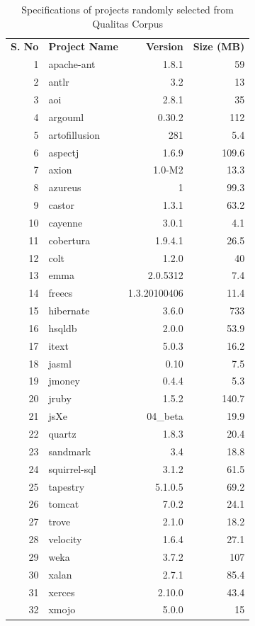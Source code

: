 \begin{table}[htp]
\caption{Specifications of projects randomly selected from Qualitas Corpus}
\bigskip
\centering
{\renewcommand{\arraystretch}{1.2} %
\begin{tabular}{rlrr}

{\textbf {S. No}}& 	{\textbf {Project Name}}	& 	{\textbf {Version}}		&	{\textbf {Size (MB)}}\\
1	&	apache-ant	&	1.8.1			&	59\\
2	&	antlr		&	3.2				&	13\\
3	&	aoi			&	2.8.1			&	35\\
4	&	argouml		&	0.30.2			&	112\\
5	&	artofillusion	&	281				&	5.4\\
6	&	aspectj		&	1.6.9			&	109.6\\
7	&	axion		&	1.0-M2			&	13.3\\
8	&	azureus		&	1				&	99.3\\
9	&	castor		&	1.3.1			&	63.2\\
10	&	cayenne		&	3.0.1			&	4.1\\
11	&	cobertura	&	1.9.4.1			&	26.5\\
12	&	colt			&	1.2.0			&	40\\
13	&	emma		&	2.0.5312		&	7.4\\
14	&	freecs		&	1.3.20100406	&	11.4\\
15	&	hibernate	&	3.6.0			&	733\\
16	&	hsqldb		&	2.0.0			&	53.9\\
17	&	itext		&	5.0.3			&	16.2\\
18	&	jasml		&	0.10			&	7.5 \\
19	&	jmoney		&	0.4.4			&	5.3\\
20	&	jruby		&	1.5.2			&	140.7\\
21	&	jsXe			&	04\_beta		&	19.9\\
22	&	quartz		&	1.8.3			&	20.4\\
23	&	sandmark	&	3.4				&	18.8\\
24	&	squirrel-sql	&	3.1.2			&	61.5\\
25	&	tapestry		&	5.1.0.5			&	69.2\\
26	&	tomcat		&	7.0.2			&	24.1\\
27	&	trove		&	2.1.0			&	18.2\\
28	&	velocity		&	1.6.4			&	27.1\\
29	&	weka		&	3.7.2			&	107\\
30	&	xalan		&	2.7.1			&	85.4\\
31	&	xerces		&	2.10.0			&	43.4\\
32	&	xmojo		&	5.0.0			&	15\\
\end{tabular}
}
\bigskip
\label{table:projects}
\end{table}



